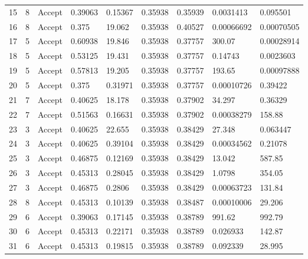 \documentclass[5p]{elsarticle}
\begin{document}
\begin{frontmatter}
\begin{table}[h!]
\begin{center}
\begin{tabular}{l | l | l|l|l|l|l|l|l}
15 &       8 & Accept &     0.39063 &     0.15367 &     0.35938 &     0.35939 &    0.0031413 &     0.095501 \\
16 &       8 & Accept &       0.375 &      19.062 &     0.35938 &     0.40527 &   0.00066692 &   0.00070505 \\
17 &       5 & Accept &     0.60938 &      19.846 &     0.35938 &     0.37757 &       300.07 &   0.00028914 \\
18 &       5 & Accept &     0.53125 &      19.431 &     0.35938 &     0.37757 &      0.14743 &    0.0023603 \\
19 &       5 & Accept &     0.57813 &      19.205 &     0.35938 &     0.37757 &       193.65 &   0.00097888 \\
20 &       5 & Accept &       0.375 &     0.31971 &     0.35938 &     0.37757 &   0.00010726 &      0.39422 \\
21 &       7 & Accept &     0.40625 &      18.178 &     0.35938 &     0.37902 &       34.297 &      0.36329 \\
22 &       7 & Accept &     0.51563 &     0.16631 &     0.35938 &     0.37902 &   0.00038279 &       158.88 \\
23 &       3 & Accept &     0.40625 &      22.655 &     0.35938 &     0.38429 &       27.348 &     0.063447 \\
24 &       3 & Accept &     0.40625 &     0.39104 &     0.35938 &     0.38429 &   0.00034562 &      0.21078 \\
25 &       3 & Accept &     0.46875 &     0.12169 &     0.35938 &     0.38429 &       13.042 &       587.85 \\
26 &       3 & Accept &     0.45313 &     0.28045 &     0.35938 &     0.38429 &       1.0798 &       354.05 \\
27 &       3 & Accept &     0.46875 &      0.2806 &     0.35938 &     0.38429 &   0.00063723 &       131.84 \\
28 &       8 & Accept &     0.45313 &     0.10139 &     0.35938 &     0.38487 &   0.00010006 &       29.206 \\
29 &       6 & Accept &     0.39063 &     0.17145 &     0.35938 &     0.38789 &       991.62 &       992.79 \\
30 &       6 & Accept &     0.45313 &     0.22171 &     0.35938 &     0.38789 &     0.026933 &       142.87 \\
31 &       6 & Accept &     0.45313 &     0.19815 &     0.35938 &     0.38789 &     0.092339 &       28.995 \\


\end{tabular}
\end{center}
\end{table}
\end{frontmatter}
\end{document}
